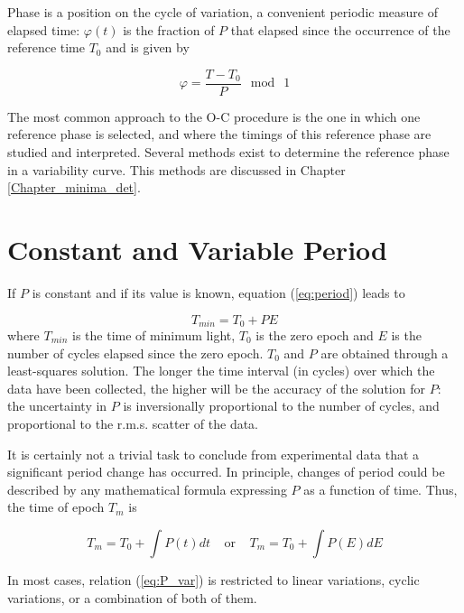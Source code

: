 Phase is a position on the cycle of variation, a convenient periodic measure of
elapsed time: $\varphi (t)$ is the fraction of $P$ that elapsed since the occurrence of the
reference time $T_{0}$ and is given by

\begin{equation} \label{eq:phase}
\varphi = \frac{T-T_{0}}{P} ~\bmod~ 1
\end{equation}

The most common approach to the O-C procedure is the one in which one reference 
phase is selected, and where the timings of this reference phase are studied
and interpreted.
Several methods exist to determine the reference phase in a variability curve. 
This methods are discussed in Chapter \ref{Chapter_minima_det}.

\section{Constant and Variable Period}
If $P$ is constant and if its value is known, equation (\ref{eq:period}) leads to

\begin{equation} \label{eq:Tmin2}
T_{min} = T_{0} + P E
\end{equation}
where $T_{min}$ is the time of minimum light, $T_{0}$
is the zero epoch and $E$ is the number of cycles elapsed since the zero epoch. $T_{0}$ and
$P$ are obtained through a least-squares solution. The longer the time interval (in
cycles) over which the data have been collected, the higher will be the accuracy
of the solution for $P$: the uncertainty in $P$ is inversionally proportional to the
number of cycles, and proportional to the r.m.s. scatter of the data.

It is certainly not a trivial task to conclude from experimental data that a
significant period change has occurred. In principle, changes of period could
be described by any mathematical formula expressing $P$ as a function of time.
Thus, the time of epoch $T_{m}$ is

\begin{equation} \label{eq:P_var}
T_{m} = T_{0} + \int P(t)dt   ~~~~~\mathrm{or}~~~~~   T_{m} = T_{0} + \int P(E)dE
\end{equation}

In most cases, relation (\ref{eq:P_var}) is restricted to linear variations, cyclic variations, or
a combination of both of them.

